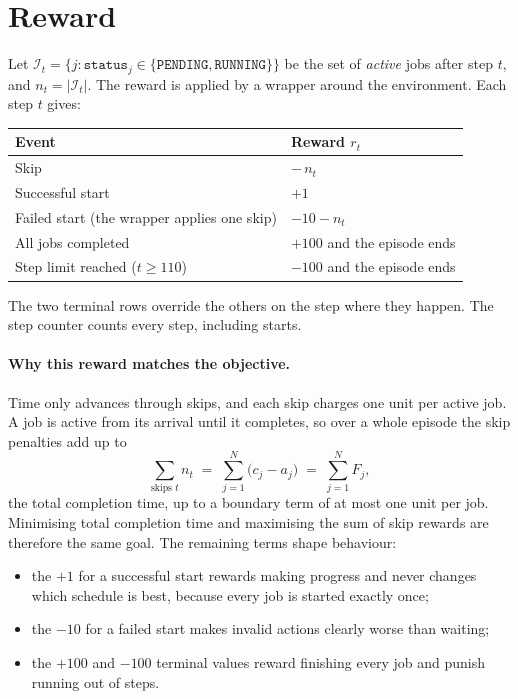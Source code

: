 \documentclass[11pt]{article}
\newcommand{\code}[1]{\texttt{#1}}
\newcommand{\N}{N}              %
\begin{document}
\section{Reward}
\label{sec:reward}

Let $\mathcal{I}_t = \{ j : \code{status}_j \in \{\code{PENDING}, \code{RUNNING}\}\}$ be the set of \emph{active} jobs after step $t$, and $n_t = |\mathcal{I}_t|$. The reward is applied by a wrapper around the environment. Each step $t$ gives:

\begin{center}
\begin{tabular}{@{}p{5.3cm}p{8cm}@{}}
\toprule
Event & Reward $r_t$ \\
\midrule
Skip & $-\,n_t$ \\
Successful start & $+1$ \\
Failed start (the wrapper applies one skip) & $-10 - n_t$ \\
All jobs completed & $+100$ and the episode ends \\
Step limit reached ($t \ge 110$) & $-100$ and the episode ends \\
\bottomrule
\end{tabular}
\end{center}

The two terminal rows override the others on the step where they happen. The step counter counts every step, including starts.

\paragraph{Why this reward matches the objective.} Time only advances through skips, and each skip charges one unit per active job. A job is active from its arrival until it completes, so over a whole episode the skip penalties add up to
\[
  \sum_{\text{skips } t} n_t \;=\; \sum_{j=1}^{\N} \big(c_j - a_j\big) \;=\; \sum_{j=1}^{\N} F_j ,
\]
the total completion time, up to a boundary term of at most one unit per job. Minimising total completion time and maximising the sum of skip rewards are therefore the same goal. The remaining terms shape behaviour:
\begin{itemize}[noitemsep]
  \item the $+1$ for a successful start rewards making progress and never changes which schedule is best, because every job is started exactly once;
  \item the $-10$ for a failed start makes invalid actions clearly worse than waiting;
  \item the $+100$ and $-100$ terminal values reward finishing every job and punish running out of steps.
\end{itemize}
\end{document}
